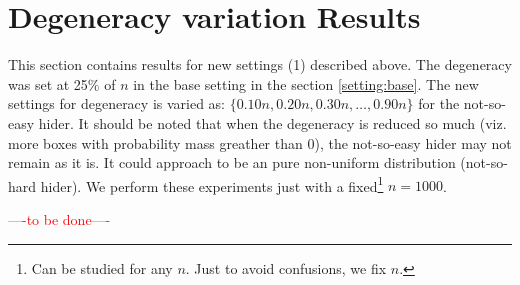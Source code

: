 \documentclass[11pt,a4paper,draft]{article}
\begin{document}
\section{Degeneracy variation Results}

This section contains results for new settings (1) described above. The degeneracy was set at 25\% of $n$ in the base setting in the section \ref{setting:base}. The new settings for degeneracy is varied as: $\{0.10n, 0.20n, 0.30n, \ldots, 0.90n\}$ for the not-so-easy hider. It should be noted that when the degeneracy is reduced so much (viz. more boxes with probability mass greather than 0), the not-so-easy hider may not remain as it is. It could approach to be an pure non-uniform distribution (not-so-hard hider). We perform these experiments just with a fixed\footnote{Can be studied for any $n$. Just to avoid confusions, we fix $n$.} $n = 1000$.

\textcolor{red}{----to be done----}
\end{document}
